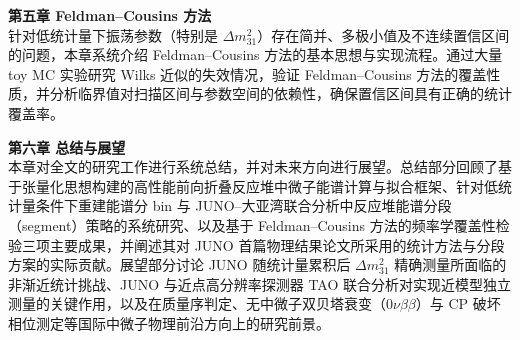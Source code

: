 \textbf{第五章 Feldman–Cousins 方法}\\
\hspace*{2em}针对低统计量下振荡参数（特别是 $\Delta m^2_{31}$）存在简并、多极小值及不连续置信区间的问题，本章系统介绍 Feldman–Cousins 方法的基本思想与实现流程。通过大量 toy MC 实验研究 Wilks 近似的失效情况，验证 Feldman–Cousins 方法的覆盖性质，并分析临界值对扫描区间与参数空间的依赖性，确保置信区间具有正确的统计覆盖率。

\textbf{第六章 总结与展望}\\
\hspace*{2em}本章对全文的研究工作进行系统总结，并对未来方向进行展望。总结部分回顾了基于张量化思想构建的高性能前向折叠反应堆中微子能谱计算与拟合框架、针对低统计量条件下重建能谱分 bin 与 JUNO--大亚湾联合分析中反应堆能谱分段（segment）策略的系统研究、以及基于 Feldman--Cousins 方法的频率学覆盖性检验三项主要成果，并阐述其对 JUNO 首篇物理结果论文所采用的统计方法与分段方案的实际贡献。展望部分讨论 JUNO 随统计量累积后 $\Delta m^2_{31}$ 精确测量所面临的非渐近统计挑战、JUNO 与近点高分辨率探测器 TAO 联合分析对实现近模型独立测量的关键作用，以及在质量序判定、无中微子双贝塔衰变（$0\nu\beta\beta$）与 CP 破坏相位测定等国际中微子物理前沿方向上的研究前景。


